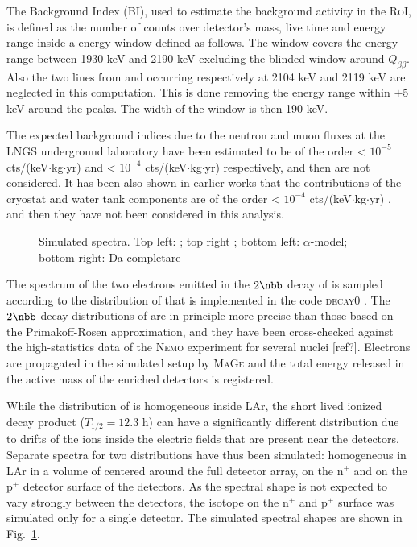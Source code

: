  The Background Index (BI), used to estimate the background activity in the \textsc{RoI}, is defined as the number of counts over detector's mass, live time and energy range inside a energy window defined as follows. The window covers the energy range between 1930 keV and 2190 keV excluding the blinded window around $Q_{\beta\beta}$. Also the two lines from  and  occurring respectively at 2104 keV and 2119 keV are neglected in this computation. This is done removing the energy range within $\pm$5 keV around the peaks. The width of the window is then 190 keV.

The expected background indices due to the neutron and muon fluxes at the LNGS underground laboratory have been estimated to be of the order < $10^{−5}$ cts/(keV$\cdot$kg$\cdot$yr) \cite{neutronsBI} and < $10^{−4}$ cts/(keV$\cdot$kg$\cdot$yr) \cite{muonsBI} respectively, and then are not considered. It has been also shown in earlier works that the contributions of the cryostat and water tank components are of the order < $10^{−4}$ cts/(keV$\cdot$kg$\cdot$yr) \cite{criowaterBI}, and then they have not been considered in this analysis.

\begin{figure}
	\centerline{%
		\hspace{0.8cm}%
	}
	\caption{Simulated spectra. Top left: ; top right ; bottom left: $\alpha$-model; bottom right: {\color{red}Da completare}}
	\label{fig:simspectra}
\end{figure}
\marginnote{$2\nbb$} The spectrum of the two electrons emitted in the $2\nbb$ decay of  is sampled according to the distribution of \cite{tables2nbb} that is implemented in the code \textsc{decay0} \cite{decay0}. The $2\nbb$ decay distributions of \cite{tables2nbb} are in principle more precise than those based on the Primakoff-Rosen approximation, and they have been cross-checked against the high-statistics data of the \textsc{Nemo} experiment for several nuclei {\color{red}[ref?]}. Electrons are propagated in the {\gerda} simulated setup by \textsc{MaGe} and the total energy released in the active mass of the enriched detectors is registered.

 While the distribution of  is homogeneous inside LAr, the short lived ionized decay product  ($T_{1/2} = 12.3$ h) can have a significantly different distribution due to drifts of the  ions inside the electric fields that are present near the detectors. Separate spectra for two  distributions have thus been simulated: homogeneous in LAr in a volume of centered around the full detector array, on the n$^+$ and on the p$^+$ detector surface of the detectors. As the spectral shape is not expected to vary strongly between the detectors, the isotope on the n$^+$ and p$^+$ surface was simulated only for a single detector. The simulated spectral shapes are shown in Fig.~\ref{fig:simspectra}.

